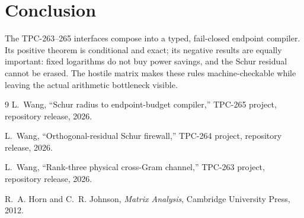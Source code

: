 \documentclass[11pt]{article}
\theoremstyle{definition}
\begin{document}
\section{Conclusion}

The TPC-263--265 interfaces compose into a typed, fail-closed endpoint
compiler.  Its positive theorem is conditional and exact; its negative
results are equally important: fixed logarithms do not buy power savings, and
the Schur residual cannot be erased.  The hostile matrix makes these rules
machine-checkable while leaving the actual arithmetic bottleneck visible.

\begin{thebibliography}{9}
L.~Wang, ``Schur radius to endpoint-budget compiler,'' TPC-265 project,
repository release, 2026.

L.~Wang, ``Orthogonal-residual Schur firewall,'' TPC-264 project,
repository release, 2026.

L.~Wang, ``Rank-three physical cross-Gram channel,'' TPC-263 project,
repository release, 2026.

R.~A. Horn and C.~R. Johnson, \emph{Matrix Analysis}, Cambridge University
Press, 2012.
\end{thebibliography}
\end{document}
